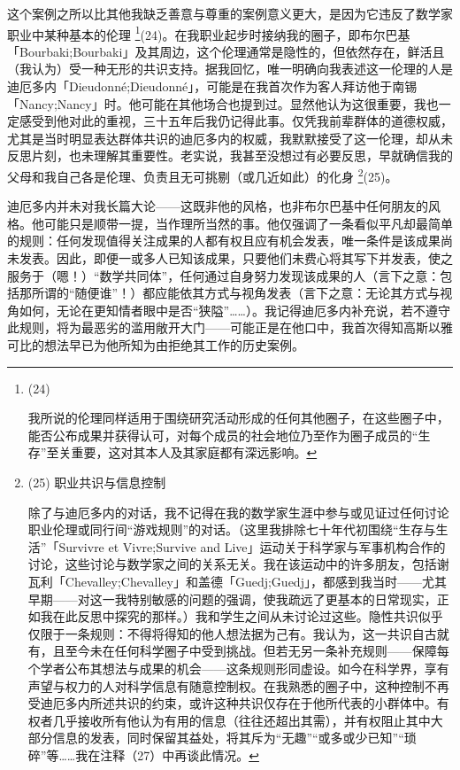 这个案例之所以比其他我缺乏善意与尊重的案例意义更大，是因为它违反了数学家职业中某种基本的伦理 \footnote{(24) \par 我所说的伦理同样适用于围绕研究活动形成的任何其他圈子，在这些圈子中，能否公布成果并获得认可，对每个成员的社会地位乃至作为圈子成员的“生存”至关重要，这对其本人及其家庭都有深远影响。}(24)。在我职业起步时接纳我的圈子，即布尔巴基「Bourbaki;Bourbaki」及其周边，这个伦理通常是隐性的，但依然存在，鲜活且（我认为）受一种无形的共识支持。据我回忆，唯一明确向我表述这一伦理的人是迪厄多内「Dieudonné;Dieudonné」，可能是在我首次作为客人拜访他于南锡「Nancy;Nancy」时。他可能在其他场合也提到过。显然他认为这很重要，我也一定感受到他对此的重视，三十五年后我仍记得此事。仅凭我前辈群体的道德权威，尤其是当时明显表达群体共识的迪厄多内的权威，我默默接受了这一伦理，却从未反思片刻，也未理解其重要性。老实说，我甚至没想过有必要反思，早就确信我的父母和我自己各是伦理、负责且无可挑剔（或几近如此）的化身 \footnote{(25) 职业共识与信息控制 \par 除了与迪厄多内的对话，我不记得在我的数学家生涯中参与或见证过任何讨论职业伦理或同行间“游戏规则”的对话。（这里我排除七十年代初围绕“生存与生活”「Survivre et Vivre;Survive and Live」运动关于科学家与军事机构合作的讨论，这些讨论与数学家之间的关系无关。我在该运动中的许多朋友，包括谢瓦利「Chevalley;Chevalley」和盖德「Guedj;Guedj」，都感到我当时——尤其早期——对这一我特别敏感的问题的强调，使我疏远了更基本的日常现实，正如我在此反思中探究的那样。）我和学生之间从未讨论过这些。隐性共识似乎仅限于一条规则：不得将得知的他人想法据为己有。我认为，这一共识自古就有，且至今未在任何科学圈子中受到挑战。但若无另一条补充规则——保障每个学者公布其想法与成果的机会——这条规则形同虚设。如今在科学界，享有声望与权力的人对科学信息有随意控制权。在我熟悉的圈子中，这种控制不再受迪厄多内所述共识的约束，或许这种共识仅存在于他所代表的小群体中。有权者几乎接收所有他认为有用的信息（往往还超出其需），并有权阻止其中大部分信息的发表，同时保留其益处，将其斥为“无趣”“或多或少已知”“琐碎”等……我在注释（27）中再谈此情况。}(25)。

迪厄多内并未对我长篇大论——这既非他的风格，也非布尔巴基中任何朋友的风格。他可能只是顺带一提，当作理所当然的事。他仅强调了一条看似平凡却最简单的规则：任何发现值得关注成果的人都有权且应有机会发表，唯一条件是该成果尚未发表。因此，即便一或多人已知该成果，只要他们未费心将其写下并发表，使之服务于（嗯！）“数学共同体”，任何通过自身努力发现该成果的人（言下之意：包括那所谓的“随便谁”！）都应能依其方式与视角发表（言下之意：无论其方式与视角如何，无论在更知情者眼中是否“狭隘”……）。我记得迪厄多内补充说，若不遵守此规则，将为最恶劣的滥用敞开大门——可能正是在他口中，我首次得知高斯以雅可比的想法早已为他所知为由拒绝其工作的历史案例。

